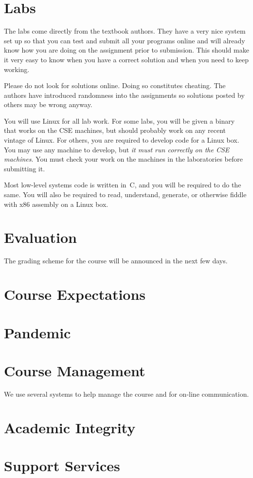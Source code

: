 \documentclass[11pt]{article}
\begin{document}
\section{Labs}

The labs come directly from the textbook authors.
They have a very nice system set up so that you can test and submit
all your programs online and will
already know how you are doing on the assignment prior to submission.
This should make it very easy to know when you have a correct solution
and when you need to keep working.

Please do not look for solutions online.
Doing so constitutes cheating.
The authors have introduced randomness into the assignments
so solutions posted by others may be wrong anyway.

You will use Linux for all lab work.
For some labs, you will be given a binary
that works on the CSE machines,
but should probably work on any recent vintage of Linux.
For others, you are required to develop code for a Linux box.
You may use any machine to develop,
but \emph{it must run correctly on the CSE machines}.
You must check your work on the machines in the laboratories
before submitting it.

Most low-level systems code is written in~C,
and you will be required to do the same.
You will also be required to read, understand, generate,
or otherwise fiddle with x86 assembly on a Linux box.

\section{Evaluation}

The grading scheme for the course will be announced in the next few days.

\section{Course Expectations}



\section{Pandemic}



\section{Course Management}

We use several systems to help manage the course
and for on-line communication.





\section{Academic Integrity}



\section{Support Services}



\printbibliography{}

\lastupdated
\end{document}
